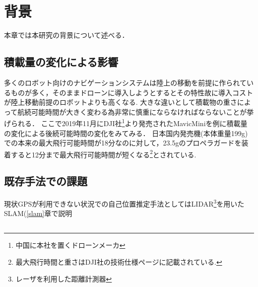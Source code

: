 \chapter{背景}
\label{background}

本章では本研究の背景について述べる．

\section{積載量の変化による影響}
多くのロボット向けのナビゲーションシステムは陸上の移動を前提に作られているものが多く，そのままドローンに導入しようとするとその特性故に導入コストが陸上移動前提のロボットよりも高くなる.
大きな違いとして積載物の重さによって航続可能時間が大きく変わる為非常に慎重にならなければならないことが挙げられる．
ここで2019年11月にDJI社\footnote{中国に本社を置くドローンメーカ}より発売されたMavicMiniを例に積載量の変化による後続可能時間の変化をみてみる．
日本国内発売機(本体重量199g)での本来の最大飛行可能時間が18分なのに対して，23.5gのプロペラガードを装着すると12分まで最大飛行可能時間が短くなる\footnote{最大飛行時間と重さはDJI社の技術仕様ページに記載されている.}とされている.

\section{既存手法での課題}
現状GPSが利用できない状況での自己位置推定手法としてはLIDAR\footnote{レーザを利用した距離計測器}を用いたSLAM(\ref{slam}章で説明

\section{}
